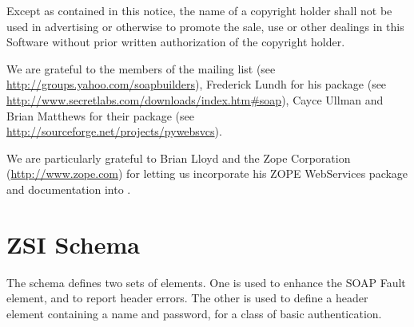 \documentclass{manual}
\begin{document}
Except as contained in this notice, the name of a copyright holder
shall not be used in advertising or otherwise to promote the sale, use
or other dealings in this Software without prior written authorization
of the copyright holder.

\vfill

\centerline{}

We are grateful to the members of the 
mailing list (see \url{http://groups.yahoo.com/soapbuilders}),
Frederick Lundh for his  package (see
\url{http://www.secretlabs.com/downloads/index.htm\#soap}),
Cayce Ullman and Brian Matthews for their  package
(see \url{http://sourceforge.net/projects/pywebsvcs}).

We are particularly grateful to Brian Lloyd and the Zope Corporation
(\url{http://www.zope.com}) for letting us incorporate his ZOPE
WebServices package and documentation into \ZSI{}.

\tableofcontents{}













\chapter{ZSI Schema}

The \ZSI{} schema defines two sets of elements.  One is used to enhance
the SOAP Fault  element, and to report header errors.
The other is used to define a header element containing a name and
password, for a class of basic authentication.

\ifx\htmlonly\undefined\else\usepackage{verbatim}\fi

\end{document}
